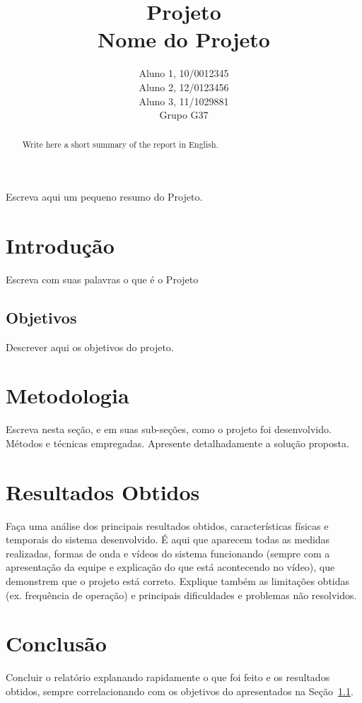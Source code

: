 \documentclass[12pt]{article}
\title{Projeto\\ 
Nome do Projeto}
\author{Aluno 1, 10/0012345\\
        Aluno 2,  12/0123456\\
        Aluno 3, 11/1029881\\
        Grupo G37
}
\begin{document}
 
\maketitle

 \begin{abstract}
   Write here a short summary of the report in English.
 \end{abstract}
    
 \begin{resumo} 
  Escreva aqui um pequeno resumo do Projeto.
 \end{resumo}


\section{Introdução}
\label{sec:Introducao}

Escreva com suas palavras o que é o Projeto

\subsection{Objetivos}
\label{sec:Objetivos}

Descrever aqui os objetivos do projeto.

\section{Metodologia}
\label{sec:Metodologia}

Escreva nesta seção, e em suas sub-seções, como o projeto foi desenvolvido. Métodos e técnicas empregadas. 
Apresente detalhadamente a solução proposta.

\section{Resultados Obtidos}
\label{sec:Resultados}

Faça uma análise dos principais resultados obtidos, características físicas e temporais do sistema desenvolvido.
É aqui que aparecem todas as medidas realizadas, formas de onda e vídeos do sistema funcionando (sempre com a apresentação da equipe e explicação do que está acontecendo no vídeo), que demonstrem que o projeto está correto.
Explique também as limitações obtidas (ex. frequência de operação) e principais dificuldades e problemas não resolvidos.

\section{Conclusão}
\label{sec:Conclusao}

Concluir o relatório explanando rapidamente o que foi feito e os resultados obtidos, sempre correlacionando com os objetivos do apresentados na Seção~\ref{sec:Objetivos}. 



\end{document}

